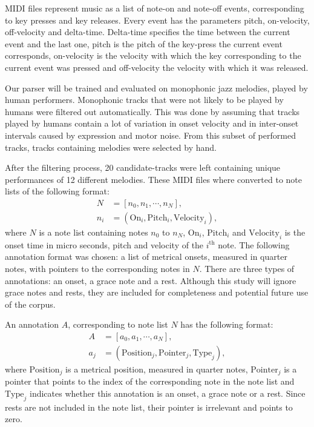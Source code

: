 MIDI files represent music as a list of note-on and note-off events, corresponding to key presses and key releases. Every event has the parameters pitch, on-velocity, off-velocity and delta-time. Delta-time specifies the time between the current event and the last one, pitch is the pitch of the key-press the current event corresponds, on-velocity is the velocity with which the key corresponding to the current event was pressed and off-velocity the velocity with which it was released.

Our parser will be trained and evaluated on monophonic jazz melodies, played by human performers. Monophonic tracks that were not likely to be played by humans were filtered out automatically. This was done by assuming that tracks played by humans contain a lot of variation in onset velocity and in inter-onset intervals caused by expression and motor noise. From this subset of performed tracks, tracks containing melodies were selected by hand.

After the filtering process, 20 candidate-tracks were left containing unique performances of 12 different melodies. These MIDI files where converted to note lists of the following format:
\begin{align*}
N &= [n_0, n_1, \cdots, n_N],\\
n_i &= (\mathrm{On}_i, \mathrm{Pitch}_i, \mathrm{Velocity}_i),
\end{align*}
where $N$ is a note list containing notes $n_0$ to $n_N$, $\mathrm{On}_i$, $\mathrm{Pitch}_i$ and $\mathrm{Velocity}_i$ is the onset time in micro seconds, pitch and velocity of the $i^{\mathrm{th}}$ note. The following annotation format was chosen: a list of metrical onsets, measured in quarter notes, with pointers to the corresponding notes in $N$. There are three types of annotations: an onset, a grace note and a rest. Although this study will ignore grace notes and rests, they are included for completeness and potential future use of the corpus.

An annotation $A$, corresponding to note list $N$ has the following format:
\begin{align*}
A &= [a_0, a_1, \cdots, a_N],\\
a_j &= (\mathrm{Position}_j, \mathrm{Pointer}_j, \mathrm{Type}_j),
\end{align*}
where $\mathrm{Position}_j$ is a metrical position, measured in quarter notes, $\mathrm{Pointer}_j$ is a pointer that points to the index of the corresponding note in the note list and $\mathrm{Type}_j$ indicates whether this annotation is an onset, a grace note or a rest. Since rests are not included in the note list, their pointer is irrelevant and points to zero. 

